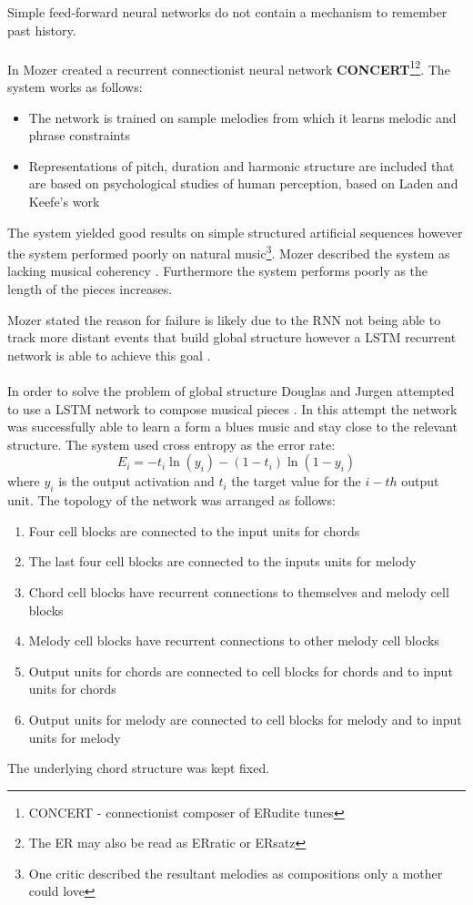 Simple feed-forward neural networks do not contain a mechanism to remember past history.  
\\
\\
In \cite{mozer1994neural} Mozer created a recurrent connectionist neural network \textbf{CONCERT}\footnote{CONCERT - connectionist composer of ERudite tunes}\footnote{The ER may also be read as ERratic or ERsatz}.
The system works as follows:
\begin{itemize}
\item The network is trained on sample melodies from which it learns melodic and phrase constraints
\item Representations of pitch, duration and harmonic structure are included that are based on psychological studies of human perception, based on Laden and Keefe's work \cite{laden1989representation}
\end{itemize}
The system yielded good results on simple structured artificial sequences however the system performed poorly on natural music\footnote{One critic described the resultant melodies as compositions only a mother could love}. Mozer described the system as lacking musical coherency \cite{mozer1994neural}. Furthermore the system performs poorly as the length of the pieces increases.

Mozer stated the reason for failure is likely due to the \ac{RNN} not being able to track more distant events that build global structure \cite{mozer1994neural} however a \ac{LSTM} recurrent network is able to achieve this goal \cite{Eck2002}.
\\
\\
In order to solve the problem of global structure Douglas and Jurgen attempted to use a \ac{LSTM} network to compose musical pieces \cite{Eck2002}. In this attempt the network was successfully able to learn a form a blues music and stay close to the relevant structure.
The system used cross entropy as the error rate:
\[
E_i = -t_i \ln(y_i) - (1-t_i)\ln (1-y_i) \]
where $y_i$ is the output activation and $t_i$ the target value for the $i-th$ output unit.
The topology of the network was arranged as follows:
\begin{enumerate}
\item Four cell blocks are connected to the input units for chords
\item The last four cell blocks are connected to the inputs units for melody
\item Chord cell blocks have recurrent connections to themselves and melody cell blocks
\item Melody cell blocks have recurrent connections to other melody cell blocks
\item Output units for chords are connected to cell blocks for chords and to input units for chords
\item Output units for melody are connected to cell blocks for melody and to input units for melody
\end{enumerate}
The underlying chord structure was kept fixed.

